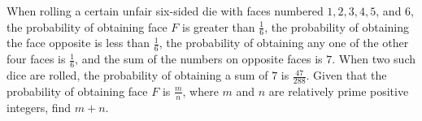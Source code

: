 When rolling a certain unfair six-sided die with faces numbered $1, 2, 3, 4, 5$, and $6$, the probability of obtaining face $F$ is greater than $\frac{1}{6}$, the probability of obtaining the face opposite is less than $\frac{1}{6}$, the probability of obtaining any one of the other four faces is $\frac{1}{6}$, and the sum of the numbers on opposite faces is $7$. When two such dice are rolled, the probability of obtaining a sum of $7$ is $\frac{47}{288}$. Given that the probability of obtaining face $F$ is $\frac{m}{n}$, where $m$ and $n$ are relatively prime positive integers, find $m+n$.
